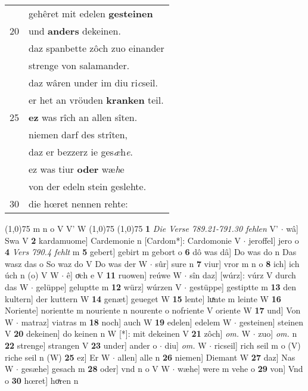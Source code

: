 \documentclass[8pt,a4paper,notitlepage]{article}
\begin{document}
\begin{table}[ht]
\begin{minipage}[t]{0.5\linewidth}
\begin{tabular}{rl}
 & gehêret mit edelen \textbf{gesteinen}\\ 
20 & und \textbf{anders} dekeinen.\\ 
 & daz spanbette zôch zuo einander\\ 
 & strenge von salamander.\\ 
 & daz wâren under im diu ri\textit{c}seil.\\ 
 & er het an vröuden \textbf{kranken} teil.\\ 
25 & \textbf{ez} was rîch an allen sîten.\\ 
 & niemen darf des strîten,\\ 
 & daz er bezzerz ie ges\textit{æ}h\textit{e}.\\ 
 & ez was tiur \textbf{oder} wæ\textit{h}e\\ 
 & von der edeln stein geslehte.\\ 
30 & die hœret nennen rehte:\\ 
\end{tabular}
\scriptsize
\line(1,0){75} \newline
m n o V V' W \newline
\line(1,0){75} \newline
\newline
\line(1,0){75} \newline
\textbf{1} \textit{Die Verse 789.21-791.30 fehlen} V'   $\cdot$ wâ] Swa V \textbf{2} kardamuome] Cardemonie n [Cardom*]: Cardomonie V  $\cdot$ jeroffel] jero o \textbf{4} \textit{Vers 790.4 fehlt} m  \textbf{5} gebert] gebirt m gebort o \textbf{6} dô was dâ] Do was do n Das wasz das o So waz do V Do was der W  $\cdot$ sûr] sure n \textbf{7} viur] vror m n o \textbf{8} ich] ich úch n (o) V W  $\cdot$ ê] oͮch e V \textbf{11} ruowen] reúwe W  $\cdot$ sîn daz] [wúrz]: vúrz V durch das W  $\cdot$ gelüppe] geluptte m \textbf{12} würz] wúrzen V  $\cdot$ gestüppe] gestiptte m \textbf{13} den kultern] der kuttern W \textbf{14} genæt] geueget W \textbf{15} lente] luͯnte m leinte W \textbf{16} Noriente] norientte m nouriente n nourente o nofriente V oriente W \textbf{17} und] Von W  $\cdot$ matraz] viatras m \textbf{18} noch] auch W \textbf{19} edelen] edelem W  $\cdot$ gesteinen] steinen V \textbf{20} dekeinen] do keinen n W [*]: mit dekeinen V \textbf{21} zôch] \textit{om.} W  $\cdot$ zuo] \textit{om.} n \textbf{22} strenge] strangen V \textbf{23} under] ander o  $\cdot$ diu] \textit{om.} W  $\cdot$ ricseil] rich seil m o (V) riche seil n (W) \textbf{25} ez] Er W  $\cdot$ allen] alle n \textbf{26} niemen] Diemant W \textbf{27} daz] Nas W  $\cdot$ gesæhe] gesach m \textbf{28} oder] vnd n o V W  $\cdot$ wæhe] were m vehe o \textbf{29} von] Vnd o \textbf{30} hœret] hoͯren n \newline
\end{minipage}
\end{table}
\end{document}
